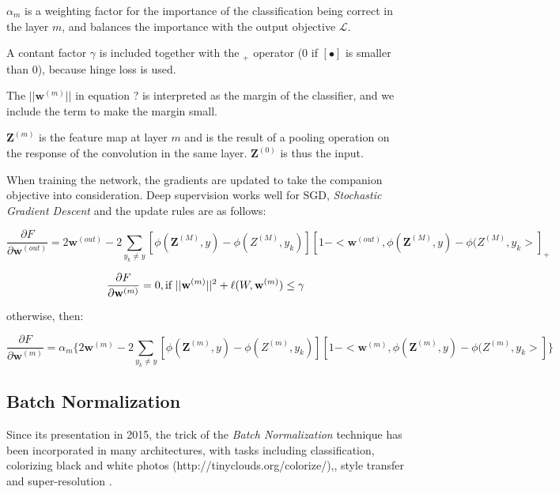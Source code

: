 $\alpha_m$ is a weighting factor for the importance of the classification being correct in the layer $m$, and balances the importance with the output objective $\mathcal{L}$.

A contant factor $\gamma$ is included together with the $_+$ operator (0 if $[\bullet]$ is smaller than 0), because hinge loss is used. %

The $||\textbf{w}^{(m)}||$ in equation ?%
 is interpreted as the margin of the classifier, and we include the term to make the margin small. 

$\textbf{Z}^{(m)}$ is the feature map at layer $m$ and is the result of a pooling operation on the response of the convolution in the same layer. $\textbf{Z}^{(0)}$ is thus the input.

When training the network, the gradients are updated to take the companion objective into consideration. Deep supervision works well for SGD, \emph{Stochastic Gradient Descent} and the update rules are as follows:

\begin{equation}
\frac{\partial F}{\partial \textbf{w}^{(out)}} = 2\textbf{w}^{(out)} - 2\sum\limits_{y_k \neq y}[\phi(\textbf{Z}^{(M)},y) - \phi({Z}^{(M)},y_k)][1 - <\textbf{w}^{(out)}, \phi(\textbf{Z}^{(M)},y) - \phi({Z}^{(M)},y_k>]_+
\end{equation}

\begin{equation}
\frac{\partial F}{\partial \textbf{w}^{(m)}} = 0, \text{if ||\textbf{w}$^{(m)}||^2 + \ell(W,\textbf{w}^{(m)}) \leq \gamma $}
\end{equation}

otherwise, then:

\begin{equation}
\frac{\partial F}{\partial \textbf{w}^{(m)}} =
\alpha_m\{2\textbf{w}^{(m)}-2\sum\limits_{y_k \neq y}[\phi(\textbf{Z}^{(m)},y) - \phi({Z}^{(m)},y_k)][1 - <\textbf{w}^{(m)}, \phi(\textbf{Z}^{(m)},y) - \phi({Z}^{(m)},y_k>] \}
\end{equation}

\subsection{Batch Normalization}
Since its presentation in 2015, the trick of the \emph{Batch Normalization} technique \citep{Batchnorm} has been incorporated in many architectures, with tasks including classification, colorizing black and white photos (http://tinyclouds.org/colorize/),\citep{Colorful-colorization}, style transfer \citep{Perceptual-losses} and super-resolution \citep{Perceptual-losses}. 

